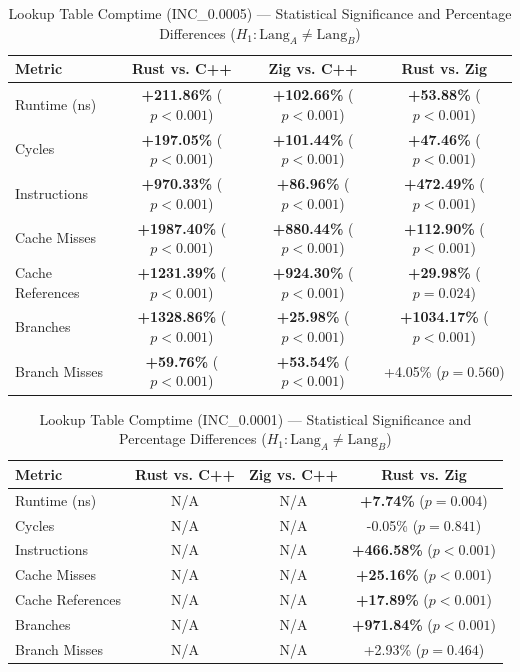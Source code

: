 \begin{table}[htbp]
\centering
\caption{Lookup Table Comptime (INC_0.0005) --- Statistical Significance and Percentage Differences ($H_1: \text{Lang}_A \neq \text{Lang}_B$)}
\label{tab:lut_comptime_0_0005}
\begin{tabular}{l ccc}
\toprule
\textbf{Metric} & \textbf{Rust vs. C++} & \textbf{Zig vs. C++} & \textbf{Rust vs. Zig} \\
\midrule
Runtime (ns) & \textbf{+211.86\%} ($p < 0.001$) & \textbf{+102.66\%} ($p < 0.001$) & \textbf{+53.88\%} ($p < 0.001$) \\
Cycles & \textbf{+197.05\%} ($p < 0.001$) & \textbf{+101.44\%} ($p < 0.001$) & \textbf{+47.46\%} ($p < 0.001$) \\
Instructions & \textbf{+970.33\%} ($p < 0.001$) & \textbf{+86.96\%} ($p < 0.001$) & \textbf{+472.49\%} ($p < 0.001$) \\
Cache Misses & \textbf{+1987.40\%} ($p < 0.001$) & \textbf{+880.44\%} ($p < 0.001$) & \textbf{+112.90\%} ($p < 0.001$) \\
Cache References & \textbf{+1231.39\%} ($p < 0.001$) & \textbf{+924.30\%} ($p < 0.001$) & \textbf{+29.98\%} ($p = 0.024$) \\
Branches & \textbf{+1328.86\%} ($p < 0.001$) & \textbf{+25.98\%} ($p < 0.001$) & \textbf{+1034.17\%} ($p < 0.001$) \\
Branch Misses & \textbf{+59.76\%} ($p < 0.001$) & \textbf{+53.54\%} ($p < 0.001$) & +4.05\% ($p = 0.560$) \\
\bottomrule
\end{tabular}
\end{table}


\begin{table}[htbp]
\centering
\caption{Lookup Table Comptime (INC_0.0001) --- Statistical Significance and Percentage Differences ($H_1: \text{Lang}_A \neq \text{Lang}_B$)}
\label{tab:lut_comptime_0_0001}
\begin{tabular}{l ccc}
\toprule
\textbf{Metric} & \textbf{Rust vs. C++} & \textbf{Zig vs. C++} & \textbf{Rust vs. Zig} \\
\midrule
Runtime (ns) & N/A & N/A & \textbf{+7.74\%} ($p = 0.004$) \\
Cycles & N/A & N/A & -0.05\% ($p = 0.841$) \\
Instructions & N/A & N/A & \textbf{+466.58\%} ($p < 0.001$) \\
Cache Misses & N/A & N/A & \textbf{+25.16\%} ($p < 0.001$) \\
Cache References & N/A & N/A & \textbf{+17.89\%} ($p < 0.001$) \\
Branches & N/A & N/A & \textbf{+971.84\%} ($p < 0.001$) \\
Branch Misses & N/A & N/A & +2.93\% ($p = 0.464$) \\
\bottomrule
\end{tabular}
\end{table}

